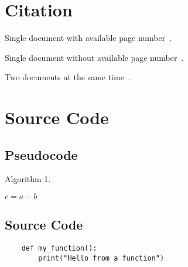 \section{Citation}

Single document with available page number~.

Single document without available page number~.

Two documents at the same time~.

\section{Source Code}

\subsection{Pseudocode}
\begin{algorithm}
\caption{Algorithm 1.}
\label{alg:alg-1}
     {
        $c = a - b$ \;
    }
\end{algorithm}

\subsection{Source Code}

\begin{verbatim}
    def my_function():
        print("Hello from a function")
\end{verbatim}
